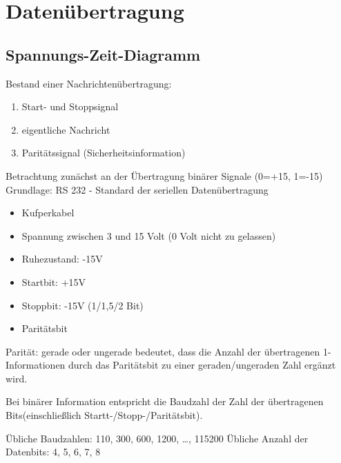 \chapter{Datenübertragung}

\section{Spannungs-Zeit-Diagramm}

Bestand einer Nachrichtenübertragung:

\begin{enumerate}
\item Start- und Stoppsignal
\item eigentliche Nachricht
\item Paritätssignal (Sicherheitsinformation)
\end{enumerate}

Betrachtung zunächst an der Übertragung binärer Signale (0=+15, 1=-15)
Grundlage: RS 232 - Standard der seriellen Datenübertragung
\begin{itemize}
\item Kufperkabel
\item Spannung zwischen 3 und 15 Volt (0 Volt nicht zu gelassen)
\item Ruhezustand: -15V
\item Startbit: +15V
\item Stoppbit: -15V (1/1,5/2 Bit)
\item Paritätsbit
\end{itemize}
Parität: gerade oder ungerade bedeutet, dass die Anzahl der übertragenen 1-Informationen durch das Paritätsbit zu einer geraden/ungeraden Zahl ergänzt wird.

Bei binärer Information entspricht die Baudzahl der Zahl der übertragenen Bits(einschließlich Startt-/Stopp-/Paritätsbit). 

Übliche Baudzahlen: 110, 300, 600, 1200, …, 115200
Übliche Anzahl der Datenbits: 4, 5, 6, 7, 8



